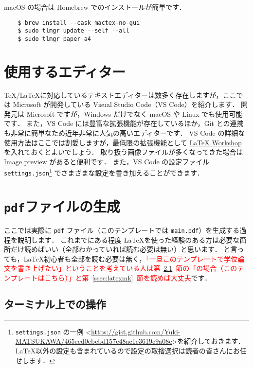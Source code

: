 macOS の場合は Homebrew でのインストールが簡単です．
\begin{verbatim}
    $ brew install --cask mactex-no-gui
    $ sudo tlmgr update --self --all
    $ sudo tlmgr paper a4
\end{verbatim}

\section{使用するエディター}
\label{sec:editor}

\TeX/\LaTeX に対応しているテキストエディターは数多く存在しますが，ここでは Microsoft が開発している Visual Studio Code（VS Code）を紹介します．
開発元は Microsoft ですが，Windows だけでなく macOS や Linux でも使用可能です．
また，VS Code には豊富な拡張機能が存在しているほか，Git との連携も非常に簡単なため近年非常に人気の高いエディターです．
VS Code の詳細な使用方法はここでは割愛しますが，最低限の拡張機能として \href{https://marketplace.visualstudio.com/items?itemName=James-Yu.latex-workshop}{LaTeX Workshop} を入れておくとよいでしょう．
取り扱う画像ファイルが多くなってきた場合は \href{https://marketplace.visualstudio.com/items?itemName=kisstkondoros.vscode-gutter-preview}{Image preview} があると便利です．
また，VS Code の設定ファイル \verb|settings.json|\footnote{\texttt{settings.json} の一例 \textless\url{https://gist.github.com/Yuki-MATSUKAWA/465ecd0ebcbd157e48ac1e3619c9a08c}\textgreater を紹介しておきます．\LaTeX 以外の設定も含まれているので設定の取捨選択は読者の皆さんにお任せします．} でさまざまな設定を書き加えることができます．

\section{\texttt{pdf}ファイルの生成}
\label{sec:makepdf}

ここでは実際に \verb|pdf| ファイル（このテンプレートでは \verb|main.pdf|）を生成する過程を説明します．
これまでにある程度 \LaTeX を使った経験のある方は必要な箇所だけ読めばいい（全部わかっていれば読む必要は無い）と思います．
と言っても，\LaTeX 初心者も全部を読む必要は無く，\textcolor{red}{「一旦このテンプレートで学位論文を書き上げたい」ということを考えている人は第~\ref{ssec:terminal}~節の「\LuaLaTeX の場合（このテンプレートはこちら）」と第~\ref{ssec:latexmk}~節を読めば大丈夫}です．

\subsection{ターミナル上での操作}
\label{ssec:terminal}

